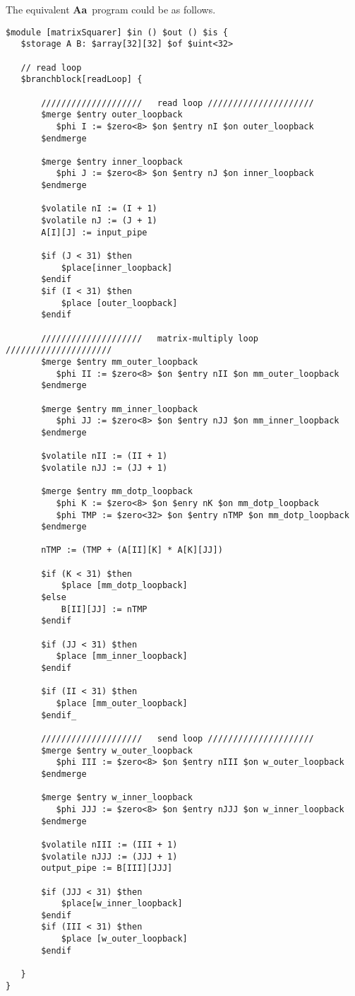 \documentclass[12pt]{article}
\newcommand{\Aa}{{\bf Aa}~}
\begin{document}
The equivalent \Aa program could be as follows.
\begin{verbatim}
$module [matrixSquarer] $in () $out () $is {
   $storage A B: $array[32][32] $of $uint<32>

   // read loop
   $branchblock[readLoop] {

       ////////////////////   read loop /////////////////////
       $merge $entry outer_loopback
          $phi I := $zero<8> $on $entry nI $on outer_loopback
       $endmerge

       $merge $entry inner_loopback
          $phi J := $zero<8> $on $entry nJ $on inner_loopback
       $endmerge

       $volatile nI := (I + 1)
       $volatile nJ := (J + 1)
       A[I][J] := input_pipe

       $if (J < 31) $then
           $place[inner_loopback]
       $endif 
       $if (I < 31) $then
           $place [outer_loopback]
       $endif
   
       ////////////////////   matrix-multiply loop /////////////////////
       $merge $entry mm_outer_loopback
          $phi II := $zero<8> $on $entry nII $on mm_outer_loopback
       $endmerge

       $merge $entry mm_inner_loopback
          $phi JJ := $zero<8> $on $entry nJJ $on mm_inner_loopback
       $endmerge

       $volatile nII := (II + 1)
       $volatile nJJ := (JJ + 1)

       $merge $entry mm_dotp_loopback
          $phi K := $zero<8> $on $enry nK $on mm_dotp_loopback
          $phi TMP := $zero<32> $on $entry nTMP $on mm_dotp_loopback
       $endmerge
 
       nTMP := (TMP + (A[II][K] * A[K][JJ])

       $if (K < 31) $then
           $place [mm_dotp_loopback]
       $else
           B[II][JJ] := nTMP
       $endif

       $if (JJ < 31) $then
          $place [mm_inner_loopback]
       $endif 

       $if (II < 31) $then
          $place [mm_outer_loopback]
       $endif_

       ////////////////////   send loop /////////////////////
       $merge $entry w_outer_loopback
          $phi III := $zero<8> $on $entry nIII $on w_outer_loopback
       $endmerge

       $merge $entry w_inner_loopback
          $phi JJJ := $zero<8> $on $entry nJJJ $on w_inner_loopback
       $endmerge

       $volatile nIII := (III + 1)
       $volatile nJJJ := (JJJ + 1)
       output_pipe := B[III][JJJ]

       $if (JJJ < 31) $then
           $place[w_inner_loopback]
       $endif 
       $if (III < 31) $then
           $place [w_outer_loopback]
       $endif
   
   } 
}
\end{verbatim}
\end{document}
